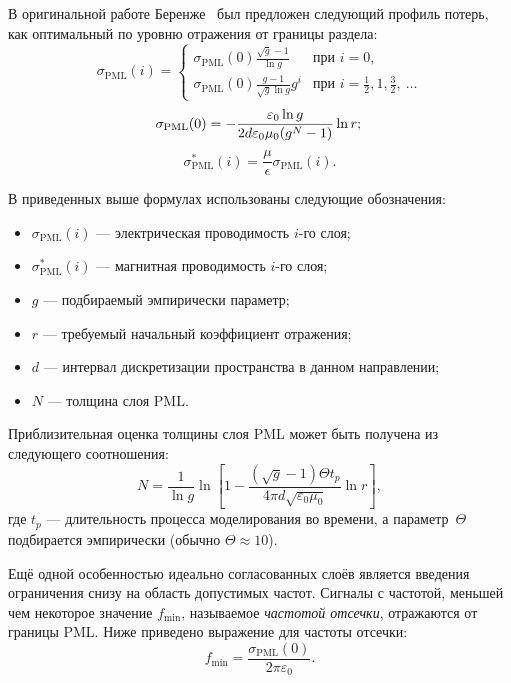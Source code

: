 В оригинальной работе Беренже~\cite{Berenger} был предложен следующий профиль потерь, как оптимальный по уровню отражения от границы раздела:
\begin{equation*}
\sigma_\text{PML}(i) = \left\{
\begin{array}{ll}
    \sigma_\text{PML}(0)\frac{\sqrt{g}-1}{\ln{g}}     & \text{при~} i=0,\\
    \sigma_\text{PML}(0)\frac{g-1}{\sqrt{g}\ln{g}}g^i & \text{при~} i=\frac12,1,\frac32,~\ldots
\end{array}
\right.
\end{equation*}
\begin{equation*}
\sigma_\text{PML}(0) = -\frac{\varepsilon_0 \ln{g}} {2 d \varepsilon_0\mu_0 (g^N-1)} \ln{r};\\
\end{equation*}
\begin{equation*}
\sigma^{*}_\text{PML}(i) = \frac{\mu}{\epsilon} \sigma_\text{PML}(i).
\end{equation*}

\noindent
В приведенных выше формулах использованы следующие обозначения:
\begin{itemize}[label={}]
\item $ \sigma_\text{PML}(i) $ --- электрическая проводимость $i$-го слоя;
\item $ \sigma^{*}_\text{PML}(i) $ --- магнитная проводимость $i$-го слоя;
\item $g$ --- подбираемый эмпирически параметр;
\item $r$ --- требуемый начальный коэффициент отражения;
\item $d$ --- интервал дискретизации пространства в данном направлении;
\item $N$ --- толщина слоя PML.
\end{itemize}

\noindent
Приблизительная оценка толщины слоя PML может быть получена из следующего
соотношения:
\begin{equation*}
    N= \frac{1}{\ln g} \ln
    \left[
        1 - \frac{(\sqrt{g}-1)\Theta t_p}{4\pi d \sqrt{\varepsilon_0\mu_0}} \ln{r}
    \right],
\end{equation*}
где $t_p$ --- длительность процесса моделирования во времени,
а параметр~$\Theta$ подбирается эмпирически (обычно $\Theta\approx10$).

Ещё одной особенностью идеально согласованных слоёв является введения ограничения снизу на область допустимых частот. Сигналы с частотой, меньшей чем некоторое значение $f_{\text{min}}$, называемое \emph{частотой отсечки}, отражаются от границы PML. Ниже приведено выражение для частоты отсечки:
\begin{equation*}
    f_{\text{min}} = \frac{\sigma_\text{PML}(0)}{2\pi\varepsilon_0}.
\end{equation*}

